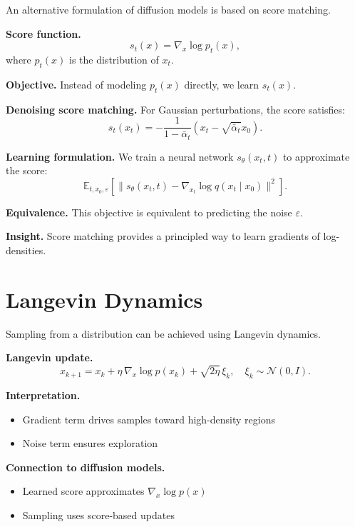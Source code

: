 An alternative formulation of diffusion models is based on score matching.

\medskip

\noindent
\textbf{Score function.}
\[
s_t(x) = \nabla_x \log p_t(x),
\]
where $p_t(x)$ is the distribution of $x_t$.

\medskip

\noindent
\textbf{Objective.}  
Instead of modeling $p_t(x)$ directly, we learn $s_t(x)$.

\medskip

\noindent
\textbf{Denoising score matching.}  
For Gaussian perturbations, the score satisfies:
\[
s_t(x_t) = -\frac{1}{1 - \bar{\alpha}_t} (x_t - \sqrt{\bar{\alpha}_t} x_0).
\]

\medskip

\noindent
\textbf{Learning formulation.}  
We train a neural network $s_\theta(x_t, t)$ to approximate the score:
\[
\mathbb{E}_{t, x_0, \varepsilon}
\left[
\| s_\theta(x_t, t) - \nabla_{x_t} \log q(x_t \mid x_0) \|^2
\right].
\]

\medskip

\noindent
\textbf{Equivalence.}  
This objective is equivalent to predicting the noise $\varepsilon$.

\medskip

\noindent
\textbf{Insight.}  
Score matching provides a principled way to learn gradients of log-densities.

\section{Langevin Dynamics}

Sampling from a distribution can be achieved using Langevin dynamics.

\medskip

\noindent
\textbf{Langevin update.}
\[
x_{k+1} = x_k + \eta \, \nabla_x \log p(x_k) + \sqrt{2\eta} \, \xi_k,
\quad \xi_k \sim \mathcal{N}(0, I).
\]

\medskip

\noindent
\textbf{Interpretation.}
\begin{itemize}
    \item Gradient term drives samples toward high-density regions
    \item Noise term ensures exploration
\end{itemize}

\medskip

\noindent
\textbf{Connection to diffusion models.}
\begin{itemize}
    \item Learned score approximates $\nabla_x \log p(x)$
    \item Sampling uses score-based updates
\end{itemize}

